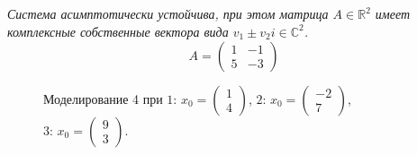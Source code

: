 \documentclass[a5paper, 10pt]{article}
\theoremstyle{definition}
\theoremstyle{plain}
\theoremstyle{remark}
\begin{document}
\subsection{}
\textit{Система асимптотически устойчива, при этом матрица $A \in \mathbb{R}^2$ имеет комплексные собственные вектора вида $v_1 \pm v_2 i \in \mathbb{C}^2$.}
\begin{equation}
A =
\begin{pmatrix}
1 & -1  \\
5 & -3
\end{pmatrix}
\end{equation}
\begin{figure}[h!]
\caption{Моделирование 4 при  $1: \, x_0 = \begin{pmatrix} 1 \\ 4 \end{pmatrix}$, $2: \, x_0 = \begin{pmatrix} -2 \\ 7 \end{pmatrix}$, $3: \, x_0 = \begin{pmatrix} 9 \\ 3 \end{pmatrix}$.}
\end{figure}
\end{document}
